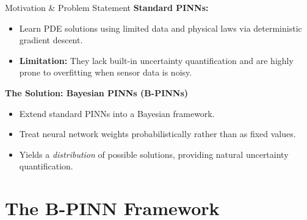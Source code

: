 \documentclass[10pt, aspectratio=169]{beamer}
\begin{document}
\begin{frame}{Motivation \& Problem Statement}
    \textbf{Standard PINNs:}
    \begin{itemize}
        \item Learn PDE solutions using limited data and physical laws via deterministic gradient descent.
        \item \textbf{Limitation:} They lack built-in uncertainty quantification and are highly prone to overfitting when sensor data is noisy.
    \end{itemize}
    \vspace{0.5cm}
    \textbf{The Solution: Bayesian PINNs (B-PINNs) \cite{Yang_2021}}
    \begin{itemize}
        \item Extend standard PINNs into a Bayesian framework.
        \item Treat neural network weights probabilistically rather than as fixed values.
        \item Yields a \textit{distribution} of possible solutions, providing natural uncertainty quantification.
    \end{itemize}
\end{frame}

\section{The B-PINN Framework}
\end{document}
